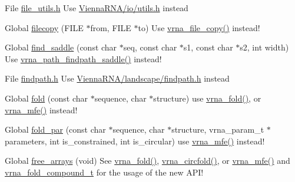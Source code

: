 \begin{DoxyRefList}
\item[File \mbox{\hyperlink{file__utils_8h}{file\+\_\+utils.h}} ]\label{deprecated__deprecated000064}%
%
Use \mbox{\hyperlink{io_2utils_8h}{Vienna\+RNA/io/utils.\+h}} instead  
\item[Global \mbox{\hyperlink{utils_2basic_8h_ab213334ce977b6d21611cdea6b80c3bf}{filecopy}} (FILE $\ast$from, FILE $\ast$to)]\label{deprecated__deprecated000192}%
%
Use \mbox{\hyperlink{group__file__utils_ga4382a56d2fee9ed738364b99329edc7c}{vrna\+\_\+file\+\_\+copy()}} instead!  
\item[Global \mbox{\hyperlink{group__paths__deprecated_ga4c0dabf032c04eeab9c7370d15db6ad2}{find\+\_\+saddle}} (const char $\ast$seq, const char $\ast$s1, const char $\ast$s2, int width)]\label{deprecated__deprecated000167}%
%
Use \mbox{\hyperlink{group__paths__direct_gad77dbfa125158f534147c0015a849bc3}{vrna\+\_\+path\+\_\+findpath\+\_\+saddle()}} instead! 
\item[File \mbox{\hyperlink{findpath_8h}{findpath.h}} ]\label{deprecated__deprecated000065}%
%
Use \mbox{\hyperlink{landscape_2findpath_8h}{Vienna\+RNA/landscape/findpath.\+h}} instead  
\item[Global \mbox{\hyperlink{group__mfe__global__deprecated_gaadafcb0f140795ae62e5ca027e335a9b}{fold}} (const char $\ast$sequence, char $\ast$structure)]\label{deprecated__deprecated000067}%
%
use \mbox{\hyperlink{group__mfe__global_ga29a33b2895f4e67b0480271ff289afdc}{vrna\+\_\+fold()}}, or \mbox{\hyperlink{group__mfe__global_gabd3b147371ccf25c577f88bbbaf159fd}{vrna\+\_\+mfe()}} instead! 
\item[Global \mbox{\hyperlink{group__mfe__global__deprecated_ga2bc41df5d71fee6fd8da9904ee65d8fb}{fold\+\_\+par}} (const char $\ast$sequence, char $\ast$structure, vrna\+\_\+param\+\_\+t $\ast$parameters, int is\+\_\+constrained, int is\+\_\+circular)]\label{deprecated__deprecated000066}%
%
use \mbox{\hyperlink{group__mfe__global_gabd3b147371ccf25c577f88bbbaf159fd}{vrna\+\_\+mfe()}} instead! 
\item[Global \mbox{\hyperlink{group__mfe__global__deprecated_ga107fdfe5fd641868156bfd849f6866c7}{free\+\_\+arrays}} (void)]\label{deprecated__deprecated000069}%
%
See \mbox{\hyperlink{group__mfe__global_ga29a33b2895f4e67b0480271ff289afdc}{vrna\+\_\+fold()}}, \mbox{\hyperlink{group__mfe__global_gaf973483d8acbc8cc9aacfc8a9b7f0074}{vrna\+\_\+circfold()}}, or \mbox{\hyperlink{group__mfe__global_gabd3b147371ccf25c577f88bbbaf159fd}{vrna\+\_\+mfe()}} and \mbox{\hyperlink{group__fold__compound_ga1b0cef17fd40466cef5968eaeeff6166}{vrna\+\_\+fold\+\_\+compound\+\_\+t}} for the usage of the new API! 

\end{DoxyRefList}
